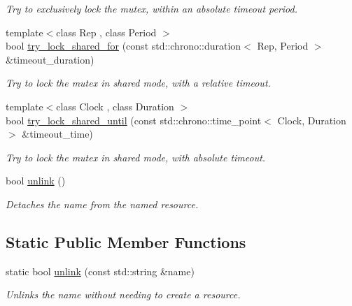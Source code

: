 \begin{DoxyCompactItemize}
\begin{DoxyCompactList}\small\item\em Try to exclusively lock the mutex, within an absolute timeout period. \end{DoxyCompactList}\item 
{\footnotesize template$<$class Rep , class Period $>$ }\\bool \hyperlink{classcpen333_1_1process_1_1impl_1_1shared__mutex__shared_a14203d4013d62fed7e1a8904c0db3793}{try\+\_\+lock\+\_\+shared\+\_\+for} (const std\+::chrono\+::duration$<$ Rep, Period $>$ \&timeout\+\_\+duration)
\begin{DoxyCompactList}\small\item\em Try to lock the mutex in shared mode, with a relative timeout. \end{DoxyCompactList}\item 
{\footnotesize template$<$class Clock , class Duration $>$ }\\bool \hyperlink{classcpen333_1_1process_1_1impl_1_1shared__mutex__shared_a25bf54e2064e78bc18e996dacb082f3c}{try\+\_\+lock\+\_\+shared\+\_\+until} (const std\+::chrono\+::time\+\_\+point$<$ Clock, Duration $>$ \&timeout\+\_\+time)
\begin{DoxyCompactList}\small\item\em Try to lock the mutex in shared mode, with absolute timeout. \end{DoxyCompactList}\item 
bool \hyperlink{classcpen333_1_1process_1_1impl_1_1shared__mutex__shared_a8e6c759f5d5266b931ed78da04652d61}{unlink} ()
\begin{DoxyCompactList}\small\item\em Detaches the name from the named resource. \end{DoxyCompactList}\end{DoxyCompactItemize}
\subsection*{Static Public Member Functions}
\begin{DoxyCompactItemize}
\item 
static bool \hyperlink{classcpen333_1_1process_1_1impl_1_1shared__mutex__shared_a855882d87dd04246229b624179837030}{unlink} (const std\+::string \&name)
\begin{DoxyCompactList}\small\item\em Unlinks the name without needing to create a resource. \end{DoxyCompactList}\end{DoxyCompactItemize}



